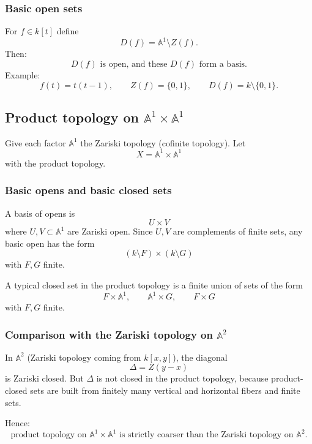 \documentclass[12pt,a4paper]{article}
\theoremstyle{plain}
\theoremstyle{definition}
\begin{document}
	\subsubsection{Basic open sets}
	
	For $f\in k[t]$ define
	\[
	D(f)=\mathbb A^1\setminus Z(f).
	\]
	Then:
	\[
	D(f)\text{ is open, and these }D(f)\text{ form a basis.}
	\]
	Example:
	\[
	f(t)=t(t-1),
	\qquad
	Z(f)=\{0,1\},
	\qquad
	D(f)=k\setminus\{0,1\}.
	\]
	
	\subsection{Product topology on $\mathbb A^1\times \mathbb A^1$}
	
	Give each factor $\mathbb A^1$ the Zariski topology (cofinite topology).
	Let
	\[
	X=\mathbb A^1\times \mathbb A^1
	\]
	with the product topology.
	
	\subsubsection{Basic opens and basic closed sets}
	
	A basis of opens is
	\[
	U\times V
	\]
	where $U,V\subset \mathbb A^1$ are Zariski open.
	Since $U,V$ are complements of finite sets, any basic open has the form
	\[
	(k\setminus F)\times (k\setminus G)
	\]
	with $F,G$ finite.
	
	A typical closed set in the product topology is a finite union of sets of the form
	\[
	F\times \mathbb A^1,
	\qquad
	\mathbb A^1\times G,
	\qquad
	F\times G
	\]
	with $F,G$ finite.
	
	\subsubsection{Comparison with the Zariski topology on $\mathbb A^2$}
	
	In $\mathbb A^2$ (Zariski topology coming from $k[x,y]$), the diagonal
	\[
	\Delta=Z(y-x)
	\]
	is Zariski closed.
	But $\Delta$ is not closed in the product topology, because product-closed sets are built from finitely many vertical and horizontal fibers and finite sets.
	
	Hence:
	\[
	\text{product topology on }\mathbb A^1\times\mathbb A^1\text{ is strictly coarser than the Zariski topology on }\mathbb A^2.
	\]
	
	
\end{document}
